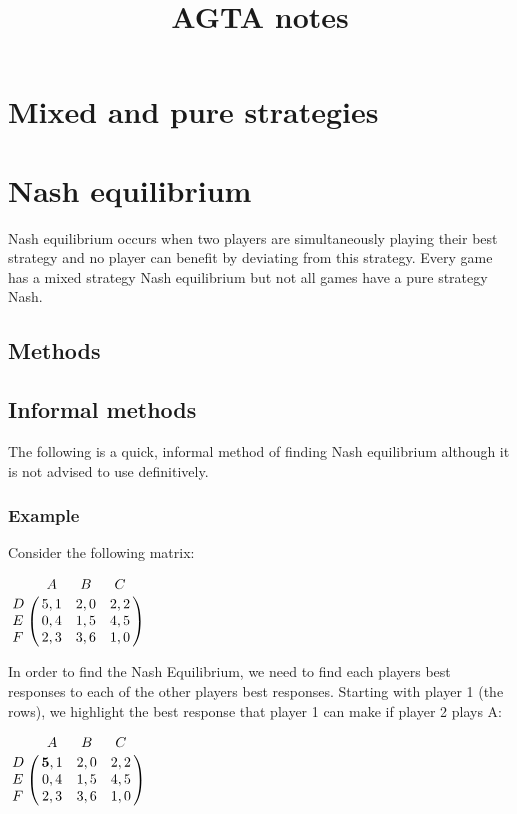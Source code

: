 \documentclass[11pt]{report}
\begin{document}
\title{AGTA notes}

\maketitle
\tableofcontents

\chapter{Mixed and pure strategies}


\chapter{Nash equilibrium}
Nash equilibrium occurs when two players are simultaneously playing their best strategy and no player can benefit by deviating from this strategy. Every game has a mixed strategy Nash equilibrium but not all games have a pure strategy Nash.

\section{Methods}

\section{Informal methods}
The following is a quick, informal method of finding Nash equilibrium although it is not advised to use definitively.

\subsection*{Example}

Consider the following matrix:

\begin{center}
$ \bordermatrix{~ & A    & B    & C    \cr 
				D & 5, 1 & 2, 0 & 2, 2 \cr 
				E & 0, 4 & 1, 5 & 4, 5 \cr
				F & 2, 3 & 3, 6 & 1, 0 \cr}$ \end{center}  
				
In order to find the Nash Equilibrium, we need to find each players best responses to each of the other players best responses. Starting with player 1 (the rows), we highlight the best response that player 1 can make if player 2 plays A:

\begin{center}
$ \bordermatrix{~ & A & B & C \cr 
				D & \textbf{5}, 1 & 2, 0 & 2, 2 \cr 
				E & 0, 4 & 1, 5 & 4, 5 \cr
				F & 2, 3 & 3, 6 & 1, 0 \cr}$  
				\end{center}
\end{document}
